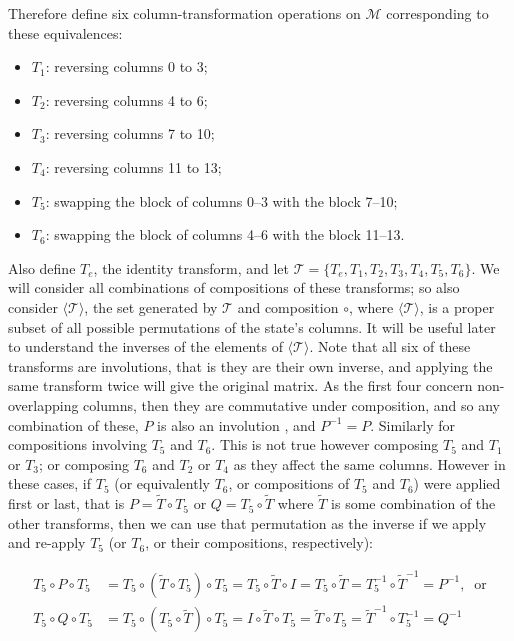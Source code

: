 \documentclass{article}
\begin{document}
Therefore define six column-transformation operations on $\mathcal{M}$
corresponding to these equivalences:
\begin{itemize}
  \item $T_1$: reversing columns 0 to 3;
  \item $T_2$: reversing columns 4 to 6;
  \item $T_3$: reversing columns 7 to 10;
  \item $T_4$: reversing columns 11 to 13;
  \item $T_5$: swapping the block of columns 0–3 with the block 7–10;
  \item $T_6$: swapping the block of columns 4–6 with the block 11–13.
\end{itemize}

Also define $T_e$, the identity transform, and let
$\mathcal{T} = \{T_e, T_1, T_2, T_3, T_4, T_5, T_6\}$.
We will consider all combinations of compositions of these transforms; so also
consider $\langle\mathcal{T}\rangle$, the set generated by $\mathcal{T}$ and
composition $\circ$, where $\langle\mathcal{T}\rangle$, is a proper subset of
all possible permutations of the state's columns.
It will be useful later to understand the inverses of the elements of
$\langle\mathcal{T}\rangle$.
Note that all six of these transforms are involutions, that is they are their
own inverse, and applying the same transform twice will give the original
matrix.
As the first four concern non-overlapping columns, then they are commutative
under composition, and so any combination of these, $P$ is also an involution
\cite[p.~22]{dummit04}, and $P^{-1} = P$.
Similarly for compositions involving $T_5$ and $T_6$.
This is not true however composing $T_5$ and $T_1$ or $T_3$; or composing $T_6$
and $T_2$ or $T_4$ as they affect the same columns.
However in these cases, if $T_5$ (or equivalently $T_6$, or compositions of
$T_5$ and $T_6$) were applied first or last, that is $P = \tilde{T} \circ T_5$
or $Q = T_5 \circ \tilde{T}$ where $\tilde{T}$ is some combination of the other
transforms, then we can use that permutation as the inverse if we apply and
re-apply $T_5$ (or $T_6$, or their compositions, respectively):

\begin{align}
T_5 \circ P \circ T_5
&= T_5 \circ (\tilde{T} \circ T_5) \circ T_5
= T_5 \circ \tilde{T} \circ I
= T_5 \circ \tilde{T}
= T_5^{-1} \circ \tilde{T}^{-1}
= P^{-1}, \;\; \text{or} \\
T_5 \circ Q \circ T_5
&= T_5 \circ (T_5 \circ \tilde{T}) \circ T_5
= I \circ \tilde{T} \circ T_5
= \tilde{T} \circ T_5
=  \tilde{T}^{-1} \circ T_5^{-1}
= Q^{-1}
\end{align}
\end{document}
